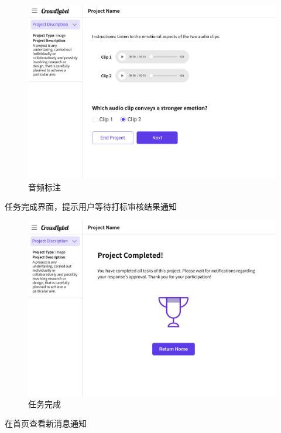 \begin{figure}[h!]
    \centering
    \includegraphics[width=\linewidth]{imgs/prototype/audio.png}
    \caption{音频标注}
\end{figure}

\newpage

任务完成界面，提示用户等待打标审核结果通知

\begin{figure}[h!]
    \centering
    \includegraphics[width=\linewidth]{imgs/prototype/completed.png}
    \caption{任务完成}
\end{figure}

\newpage

在首页查看新消息通知

